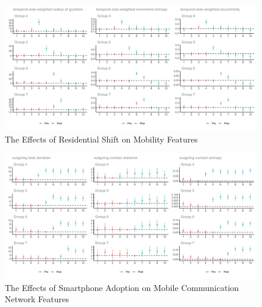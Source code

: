 \clearpage\newpage
\begin{figure}[ht!]
\centering
\caption{The Effects of Residential Shift on Mobility Features}


\includegraphics[width=1.5\textwidth, angle=90]{figures/csdid/cohort_specific_ATT_dynamics/residential_shift_mobility.png}

\label{fig:attgt_residential_shift_mobility}
\end{figure}


\clearpage\newpage
\begin{figure}[ht!]
\centering
\caption{The Effects of Smartphone Adoption on Mobile Communication Network Features}


\includegraphics[width=1.5\textwidth, angle=90]{figures/csdid/cohort_specific_ATT_dynamics/smartphone_adoption_mobile_communication_network.png}

\label{fig:attgt_smartphone_adoption_mobile_communication_network}
\end{figure}


